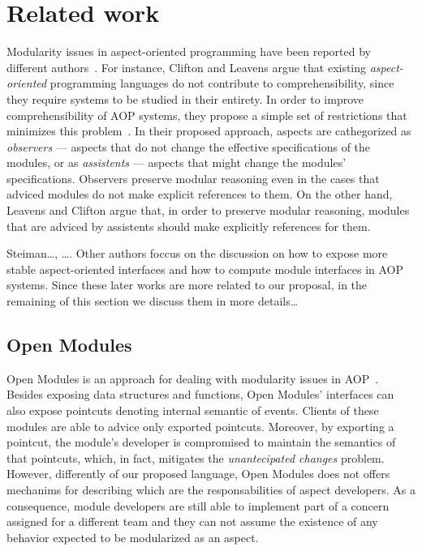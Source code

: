 \section[draft]{Related work}

Modularity issues in aspect-oriented programming have been reported by
different authors~\cite{sullivan-sigsoft-2005, leavens-observers-2002,
steiman-sigplan-2006}. For instance, Clifton and Leavens argue that
existing \emph{aspect-oriented} programming languages do not contribute to
comprehensibility, since they require systems to be studied in their entirety.
In order to improve comprehensibility of AOP systems, they propose a simple set
of restrictions that minimizes this problem~\cite{leavens-observers-2002}. In
their proposed approach, aspects are cathegorized as \emph{observers} ---
aspects that do not change the effective specifications of the modules, or as
\emph{assistents} --- aspects that might change the modules' specifications.
Observers preserve modular reasoning even in the cases that adviced modules do
not make explicit references to them. On the other hand, Leavens and Clifton
argue that, in order to preserve modular reasoning, modules that are adviced by
assistents should make explicitly references for them.


Steiman\ldots, \ldots . Other authors foccus on the discussion on how to expose
more stable aspect-oriented interfaces and how to compute module interfaces in
AOP systems. Since these later works are more related to our proposal, in the
remaining of this section we discuss them in more details\ldots


\subsection{Open Modules}

Open Modules is an approach for dealing with modularity issues in 
AOP~\cite{aldrich-ecoop-05}. Besides exposing data structures and 
functions, Open Modules' interfaces can also expose pointcuts denoting 
internal semantic of events. Clients of these modules are able to advice 
only exported pointcuts. Moreover, by exporting a pointcut, the module's 
developer is compromised to maintain the semantics of that pointcuts, 
which, in fact, mitigates the \emph{unantecipated changes} problem.
However, differently of our proposed language, Open Modules does not offers
mechanims for describing which are the responsabilities of aspect developers. As
a consequence, module developers are still able to implement part of a concern
assigned for a different team and they can not assume the existence of any
behavior expected to be modularized as an aspect.
 
